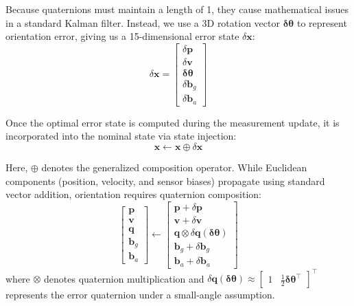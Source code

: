 \documentclass{article}
\begin{document}
	Because quaternions must maintain a length of 1, they cause mathematical issues in a standard Kalman filter. Instead, we use a 3D rotation vector $\bm{\delta\theta}$ to represent orientation error, giving us a 15-dimensional error state $\delta\mathbf{x}$:
	\begin{equation*}
		\delta\mathbf{x} =
		\begin{bmatrix}
			\delta\mathbf{p} \\
			\delta\mathbf{v} \\
			\bm{\delta\theta} \\
			\delta\mathbf{b}_g \\
			\delta\mathbf{b}_a
		\end{bmatrix}
	\end{equation*}
	
	Once the optimal error state is computed during the measurement update, it is incorporated into the nominal state via state injection:
	\begin{equation*}
		\mathbf{x} \leftarrow \mathbf{x} \oplus \delta\mathbf{x}
	\end{equation*}
	
	Here, $\oplus$ denotes the generalized composition operator. While Euclidean components (position, velocity, and sensor biases) propagate using standard vector addition, orientation requires quaternion composition:
	\begin{equation*}
		\begin{bmatrix}
			\mathbf{p} \\
			\mathbf{v} \\
			\mathbf{q} \\
			\mathbf{b}_g \\
			\mathbf{b}_a
		\end{bmatrix}
		\leftarrow
		\begin{bmatrix}
			\mathbf{p} + \delta\mathbf{p} \\
			\mathbf{v} + \delta\mathbf{v} \\
			\mathbf{q} \otimes \delta\mathbf{q}(\bm{\delta\theta}) \\
			\mathbf{b}_g + \delta\mathbf{b}_g \\
			\mathbf{b}_a + \delta\mathbf{b}_a
		\end{bmatrix}
	\end{equation*}
	where $\otimes$ denotes quaternion multiplication and $\delta\mathbf{q}(\bm{\delta\theta}) \approx \begin{bmatrix} 1 & \frac{1}{2}\bm{\delta\theta}^\top \end{bmatrix}^\top$ represents the error quaternion under a small-angle assumption.
	\vspace{1em}
	
\end{document}
